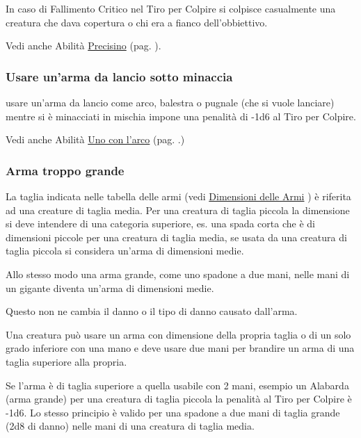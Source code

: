 \begin{multicols}{2}
In caso di Fallimento Critico nel Tiro per Colpire si colpisce casualmente una creatura che dava copertura o chi era a fianco dell'obbiettivo.

Vedi anche Abilità \hyperlink{Precisino}{Precisino} (pag. \pageref{Precisino}).

\subsubsection{Usare un'arma da lancio sotto minaccia} \label{usarearmalanciosottominaccia}

usare un'arma da lancio come arco, balestra o pugnale (che si vuole lanciare) mentre si è minacciati in mischia impone una penalità di -1d6 al Tiro per Colpire.

Vedi anche Abilità \hyperlink{Uno con l'arco}{Uno con l'arco} (pag. \pageref{Uno con l'arco}.)

\medskip
\subsubsection{Arma troppo grande} \label{armatroppogrande}

La taglia indicata nelle tabella delle armi (vedi \hyperlink{dimensionediunarma}{Dimensioni delle Armi} ) è riferita ad una creature di taglia media. Per una creatura di taglia piccola la dimensione si deve intendere di una categoria superiore, es. una spada corta che è di dimensioni piccole per una creatura di taglia media, se usata da una creatura di taglia piccola si considera un'arma di dimensioni medie.

Allo stesso modo una arma grande, come uno spadone a due mani, nelle mani di un gigante diventa un'arma di dimensioni medie.

Questo non ne cambia il danno o il tipo di danno causato dall'arma.

Una creatura può usare un arma con dimensione della propria taglia o di un solo grado inferiore con una mano e deve usare due mani per brandire un arma di una taglia superiore alla propria.

Se l'arma è di taglia superiore a quella usabile con 2 mani, esempio un Alabarda (arma grande) per una creatura di taglia piccola la penalità al Tiro per Colpire è -1d6. Lo stesso principio è valido per una spadone a due mani di taglia grande (2d8 di danno) nelle mani di una creatura di taglia media.



\end{multicols}
